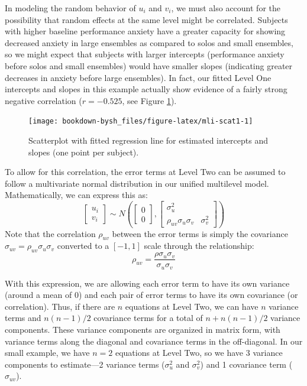\documentclass[
]{krantz}
\begin{document}
In modeling the random behavior of \(u_{i}\) and \(v_{i}\), we must also account for the possibility that random effects at the same level might be correlated. Subjects with higher baseline performance anxiety have a greater capacity for showing decreased anxiety in large ensembles as compared to solos and small ensembles, so we might expect that subjects with larger intercepts (performance anxiety before solos and small ensembles) would have smaller slopes (indicating greater decreases in anxiety before large ensembles). In fact, our fitted Level One intercepts and slopes in this example actually show evidence of a fairly strong negative correlation (\(r=-0.525\), see Figure \ref{fig:mli-scat1}).

\begin{figure}

{\centering \texttt{[image: bookdown-bysh\_files/figure-latex/mli-scat1-1]} 

}

\caption{Scatterplot with fitted regression line for estimated intercepts and slopes (one point per subject).}\label{fig:mli-scat1}
\end{figure}

To allow for this correlation, the error terms at Level Two can be assumed to follow a multivariate normal distribution in our unified multilevel model. Mathematically, we can express this as:
\[ \left[ \begin{array}{c}
            u_{i} \\ v_{i}
          \end{array}  \right] \sim N \left( \left[
          \begin{array}{c}
            0 \\ 0
          \end{array} \right], \left[
          \begin{array}{cc}
            \sigma_{u}^{2} & \\
            \rho_{uv}\sigma_{u}\sigma_v & \sigma_{v}^{2}
          \end{array} \right] \right) \]
Note that the correlation \(\rho_{uv}\) between the error terms is simply the covariance \(\sigma_{uv}=\rho_{uv}\sigma_{u}\sigma_{v}\) converted to a \([-1,1]\) scale through the relationship:
\begin{equation}
\rho_{uv} = \frac{\rho\sigma_{u}\sigma_{v}}{\sigma_{u}\sigma_{v}}
\label{eq:cor}
\end{equation}

With this expression, we are allowing each error term to have its own variance (around a mean of 0) and each pair of error terms to have its own covariance (or correlation). Thus, if there are \(n\) equations at Level Two, we can have \(n\) variance terms and \(n(n-1)/2\) covariance terms for a total of \(n + n(n-1)/2\) variance components. These variance components are organized in matrix form, with variance terms along the diagonal and covariance terms in the off-diagonal. In our small example, we have \(n=2\) equations at Level Two, so we have 3 variance components to estimate---2 variance terms (\(\sigma_{u}^{2}\) and \(\sigma_{v}^{2}\)) and 1 covariance term (\(\sigma_{uv}\)).
\end{document}
